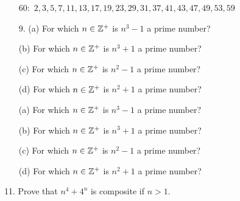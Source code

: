 \begin{mdframed}[style=darkAnswer,frametitle={Joe Starr}]
\begin{itemize}
    \item[$60:$] {$2, 3, 5, 7, 11, 13, 17, 19, 23, 29, 31, 37, 41, 43, 47, 49, 53, 59 $}
\end{itemize}
\end{mdframed}
\newpage
\begin{mdframed}[style=darkQuesion]
\begin{itemize}
        \item [9. (a)] {For which $n\in \mathbb{Z}^{\text{+}}$ is $n^{3}-1$ a prime number?}
        \item [(b)] {For which $n\in \mathbb{Z}^{\text{+}}$ is $n^{3}+1$ a prime number?}
        \item [(c)] {For which $n\in \mathbb{Z}^{\text{+}}$ is $n^{2}-1$ a prime number?}
        \item [(d)] {For which $n\in \mathbb{Z}^{\text{+}}$ is $n^{2}+1$ a prime number?}
    \end{itemize}
\end{mdframed}

\begin{mdframed}[style=darkAnswer,frametitle={Joe Starr}]
    \begin{itemize}
        \item [(a)] {For which $n\in \mathbb{Z}^{\text{+}}$ is $n^{3}-1$ a prime number?}
        \item [(b)] {For which $n\in \mathbb{Z}^{\text{+}}$ is $n^{3}+1$ a prime number?}
        \item [(c)] {For which $n\in \mathbb{Z}^{\text{+}}$ is $n^{2}-1$ a prime number?}
        \item [(d)] {For which $n\in \mathbb{Z}^{\text{+}}$ is $n^{2}+1$ a prime number?}
    \end{itemize}
\end{mdframed}

\newpage
\begin{mdframed}[style=darkQuesion]
11. Prove that $n^4+4^n$ is composite if $n>1$.
\end{mdframed}

